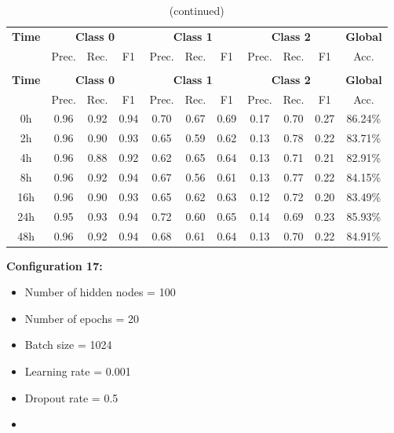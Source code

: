 \documentclass[12pt,oneside]{book} %
\begin{document}
\setlength\LTleft{1cm}
\begin{longtable}{ c ccc ccc ccc c}
\caption{Performance metrics of the LNN model for configuration 16} \\
\toprule
\textbf{Time} & \multicolumn{3}{c}{\textbf{Class 0}} & \multicolumn{3}{c}{\textbf{Class 1}} & \multicolumn{3}{c}{\textbf{Class 2}} & \textbf{Global} \\
               & Prec. & Rec. & F1  & Prec. & Rec. & F1   & Prec. & Rec. & F1  & Acc. \\
\midrule
\endfirsthead

\caption[]{(continued)} \\
\toprule
\textbf{Time} & \multicolumn{3}{c}{\textbf{Class 0}} & \multicolumn{3}{c}{\textbf{Class 1}} & \multicolumn{3}{c}{\textbf{Class 2}} & \textbf{Global} \\
               & Prec. & Rec. & F1  & Prec. & Rec. & F1   & Prec. & Rec. & F1  & Acc. \\
\midrule
\endhead

\bottomrule
\endfoot

\bottomrule
\endlastfoot

0h   & 0.96  & 0.92 & 0.94 & 0.70  & 0.67 & 0.69  & 0.17  & 0.70 & 0.27 & 86.24\% \\
2h   & 0.96  & 0.90 & 0.93 & 0.65  & 0.59 & 0.62  & 0.13  & 0.78 & 0.22 & 83.71\% \\
4h   & 0.96  & 0.88 & 0.92 & 0.62  & 0.65 & 0.64  & 0.13  & 0.71 & 0.21 & 82.91\% \\
8h   & 0.96  & 0.92 & 0.94 & 0.67  & 0.56 & 0.61  & 0.13  & 0.77 & 0.22 & 84.15\% \\
16h  & 0.96  & 0.90 & 0.93 & 0.65  & 0.62 & 0.63  & 0.12  & 0.72 & 0.20 & 83.49\% \\
24h  & 0.95  & 0.93 & 0.94 & 0.72  & 0.60 & 0.65  & 0.14  & 0.69 & 0.23 & 85.93\% \\
48h  & 0.96  & 0.92 & 0.94 & 0.68  & 0.61 & 0.64  & 0.13  & 0.70 & 0.22 & 84.91\% \\
\end{longtable}

\noindent \textbf{Configuration 17:}
\begin{multicols}{2}
    \begin{itemize}
        \item Number of hidden nodes = 100
        \item Number of epochs = 20
        \item Batch size = 1024
    \end{itemize}
    \begin{itemize}
         \item Learning rate = 0.001
         \item Dropout rate  = 0.5
         \item[\hspace{0pt}]
    \end{itemize}
\end{multicols}
\end{document}
